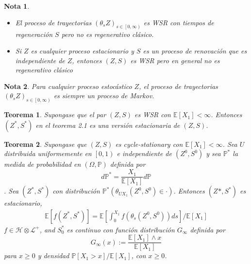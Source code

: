 \documentclass{article}
\newtheorem{Teo}{Teorema}
\newtheorem{Note}{Nota}
\newcommand{\esp}{\mathbb{E}}
\newcommand{\prob}{\mathbb{P}}
\begin{document}
\begin{Note}
\begin{itemize}
\item El proceso de trayectorias $\left(\theta_{s}Z\right)_{s\in\left[0,\infty\right)}$ es WSR con tiempos de regeneraci\'on $S$ pero no es regenerativo cl\'asico.

\item Si $Z$ es cualquier proceso estacionario y $S$ es un proceso de renovaci\'on que es independiente de $Z$, entonces $\left(Z,S\right)$ es WSR pero en general no es regenerativo cl\'asico

\end{itemize}

\end{Note}


\begin{Note}
Para cualquier proceso estoc\'astico $Z$, el proceso de trayectorias $\left(\theta_{s}Z\right)_{s\in\left[0,\infty\right)}$ es siempre un proceso de Markov.
\end{Note}



\begin{Teo}
Supongase que el par $\left(Z,S\right)$ es WSR con $\esp\left[X_{1}\right]<\infty$. Entonces $\left(Z^{*},S^{*}\right)$ en el teorema 2.1 es una versi\'on estacionaria de 
$\left(Z,S\right)$.
\end{Teo}


\begin{Teo}
Supongase que $\left(Z,S\right)$ es cycle-stationary con $\esp\left[X_{1}\right]<\infty$. Sea $U$ distribuida uniformemente en $\left[0,1\right)$ e independiente de $\left(Z^{0},S^{0}\right)$ y sea $\prob^{*}$ la medida de probabilidad en $\left(\Omega,\prob\right)$ definida por $$d\prob^{*}=\frac{X_{1}}{\esp\left[X_{1}\right]}d\prob$$. Sea $\left(Z^{*},S^{*}\right)$ con distribuci\'on $\prob^{*}\left(\theta_{UX_{1}}\left(Z^{0},S^{0}\right)\in\cdot\right)$. Entonces $\left(Z^{}*,S^{*}\right)$ es estacionario,
\begin{eqnarray*}
\esp\left[f\left(Z^{*},S^{*}\right)\right]=\esp\left[\int_{0}^{X_{1}}f\left(\theta_{s}\left(Z^{0},S^{0}\right)\right)ds\right]/\esp\left[X_{1}\right]
\end{eqnarray*}
$f\in\mathcal{H}\otimes\mathcal{L}^{+}$, and $S_{0}^{*}$ es continuo con funci\'on distribuci\'on $G_{\infty}$ definida por $$G_{\infty}\left(x\right):=\frac{\esp\left[X_{1}\right]\wedge x}{\esp\left[X_{1}\right]}$$ para $x\geq0$ y densidad $\prob\left[X_{1}>x\right]/\esp\left[X_{1}\right]$, con $x\geq0$.

\end{Teo}
\end{document}
